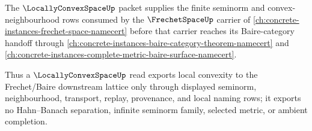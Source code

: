 The $\LocallyConvexSpaceUp$ packet supplies the finite seminorm and convex-neighbourhood rows consumed by the $\FrechetSpaceUp$ carrier of \autoref{ch:concrete-instances-frechet-space-namecert} before that carrier reaches its Baire-category handoff through \autoref{ch:concrete-instances-baire-category-theorem-namecert} and \autoref{ch:concrete-instances-complete-metric-baire-surface-namecert}.

Thus a $\LocallyConvexSpaceUp$ read exports local convexity to the Frechet/Baire downstream lattice only through displayed seminorm, neighbourhood, transport, replay, provenance, and local naming rows; it exports no Hahn--Banach separation, infinite seminorm family, selected metric, or ambient completion.
